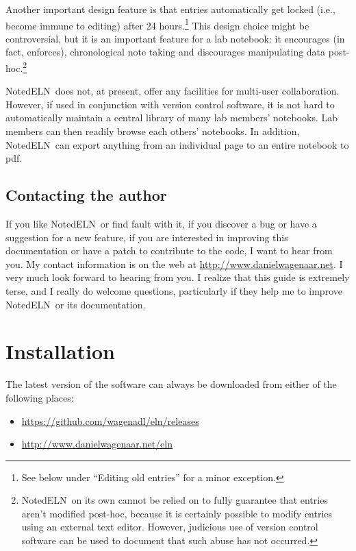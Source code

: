 \documentclass[11pt]{report}
\newcommand{\NotedELN}{NotedELN} %
\begin{document}
Another important design feature is that entries automatically get
locked (i.e., become immune to editing) after 24 hours.\footnote{See
  below under ``Editing old entries'' for a minor exception.} This
design choice might be controversial, but it is an important feature
for a lab notebook: it encourages (in fact, enforces), chronological
note taking and discourages manipulating data post-hoc.\footnote{\NotedELN\
  on its own cannot be relied on to fully guarantee that entries
  aren't modified post-hoc, because it is certainly possible to modify
  entries using an external text editor. However, judicious use of
  version control software can be used to document that such abuse has
  not occurred.}

\NotedELN\ does not, at present, offer any facilities for multi-user
collaboration. However, if used in conjunction with version control
software, it is not hard to automatically maintain a central library of
many lab members' notebooks. Lab members can then readily browse each
others' notebooks. In addition, \NotedELN\ can export anything from an
individual page to an entire notebook to pdf.

\section{Contacting the author}

If you like \NotedELN\ or find fault with it, if you discover a bug or have a
suggestion for a new feature, if you are interested in improving this
documentation or have a patch to contribute to the code, I want to
hear from you. My contact information is on the web at
\url{http://www.danielwagenaar.net}. I very much look forward to hearing
from you. I realize that this guide is extremely terse, and I
really do welcome questions, particularly if they help me to improve
\NotedELN\ or its documentation.


\chapter{Installation}

The latest version of the software can always be downloaded from
either of the following places:
\begin{itemize}
\item \url{https://github.com/wagenadl/eln/releases}
  \item \url{http://www.danielwagenaar.net/eln}
\end{itemize}
\end{document}
